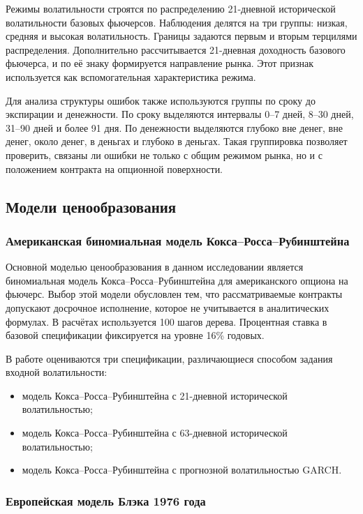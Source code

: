 \documentclass[11pt,a4paper]{article}
\begin{document}
Режимы волатильности строятся по распределению 21-дневной исторической волатильности базовых фьючерсов. Наблюдения делятся на три группы: низкая, средняя и высокая волатильность. Границы задаются первым и вторым терцилями распределения. Дополнительно рассчитывается 21-дневная доходность базового фьючерса, и по её знаку формируется направление рынка. Этот признак используется как вспомогательная характеристика режима.

Для анализа структуры ошибок также используются группы по сроку до экспирации и денежности. По сроку выделяются интервалы 0--7 дней, 8--30 дней, 31--90 дней и более 91 дня. По денежности выделяются глубоко вне денег, вне денег, около денег, в деньгах и глубоко в деньгах. Такая группировка позволяет проверить, связаны ли ошибки не только с общим режимом рынка, но и с положением контракта на опционной поверхности.

\subsection{Модели ценообразования}

\subsubsection{Американская биномиальная модель Кокса--Росса--Рубинштейна}

Основной моделью ценообразования в данном исследовании является биномиальная модель Кокса--Росса--Рубинштейна для американского опциона на фьючерс. Выбор этой модели обусловлен тем, что рассматриваемые контракты допускают досрочное исполнение, которое не учитывается в аналитических формулах. В расчётах используется 100 шагов дерева. Процентная ставка в базовой спецификации фиксируется на уровне 16\% годовых.

В работе оцениваются три спецификации, различающиеся способом задания входной волатильности:

\begin{itemize}
    \item модель Кокса--Росса--Рубинштейна с 21-дневной исторической волатильностью;
    \item модель Кокса--Росса--Рубинштейна с 63-дневной исторической волатильностью;
    \item модель Кокса--Росса--Рубинштейна с прогнозной волатильностью GARCH.
\end{itemize}

\subsubsection{Европейская модель Блэка 1976 года}
\end{document}

